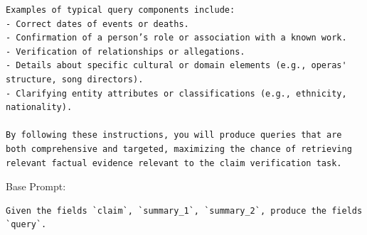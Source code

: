 \begin{instructbox}
\begin{lstlisting}[breakindent=0pt, breaklines=true, breakatwhitespace=true, frame=single, backgroundcolor=\color{blue!10}]
Examples of typical query components include:  
- Correct dates of events or deaths.  
- Confirmation of a person’s role or association with a known work.  
- Verification of relationships or allegations.  
- Details about specific cultural or domain elements (e.g., operas' structure, song directors).  
- Clarifying entity attributes or classifications (e.g., ethnicity, nationality).

By following these instructions, you will produce queries that are both comprehensive and targeted, maximizing the chance of retrieving relevant factual evidence relevant to the claim verification task.
\end{lstlisting}
\end{instructbox}\begin{instructbox}
Base Prompt:
\begin{lstlisting}[breakindent=0pt, breaklines=true, breakatwhitespace=true, frame=single, backgroundcolor=\color{gray!10}]
Given the fields `claim`, `summary_1`, `summary_2`, produce the fields `query`.
\end{lstlisting}


\end{instructbox}
